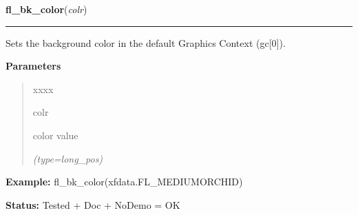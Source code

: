 \hspace{.8\funcindent}\begin{boxedminipage}{\funcwidth}

    \raggedright \textbf{fl\_bk\_color}(\textit{colr})

    \vspace{-1.5ex}

    \rule{\textwidth}{0.5\fboxrule}
\setlength{\parskip}{2ex}
    Sets the background color in the default Graphics Context (gc[0]).

\setlength{\parskip}{1ex}
      \textbf{Parameters}
      \vspace{-1ex}

      \begin{quote}
        \begin{Ventry}{xxxx}

          \item[colr]

          color value

            {\it (type=long\_pos)}

        \end{Ventry}

      \end{quote}

\textbf{Example:} fl\_bk\_color(xfdata.FL\_MEDIUMORCHID)



\textbf{Status:} Tested + Doc + NoDemo = OK



    \end{boxedminipage}

    \label{xformslib:flbasic:fl_textcolor}

    \vspace{0.5ex}

